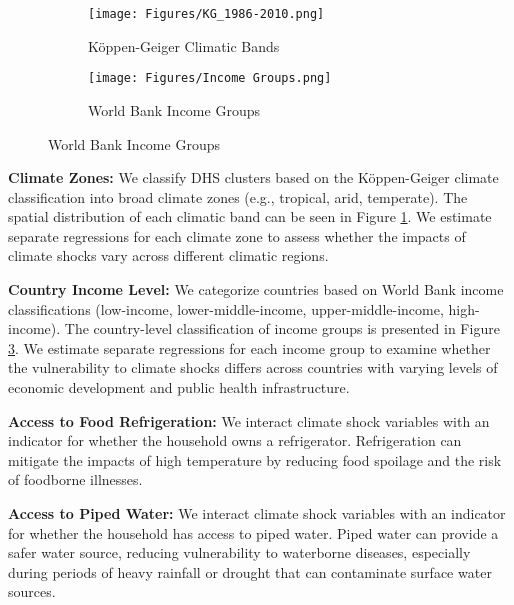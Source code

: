 \documentclass[a4paper]{article}
\begin{document}
\begin{figure}[t!]
    \caption{Geographic Distribution of Climate Zones and Income Groups}
    \begin{center}        
        \begin{subfigure}[b]{.8\linewidth}
            \texttt{[image: Figures/KG\_1986-2010.png]}
            \caption{Köppen-Geiger Climatic Bands}
            \label{fig:distr_KG} 
        \end{subfigure}
        \begin{subfigure}[b]{.8\linewidth}
            \texttt{[image: Figures/Income Groups.png]}
            \caption{World Bank Income Groups}
            \label{fig:distr_wbincomegroup} 
        \end{subfigure}
    \end{center}
\end{figure}


\noindent \textbf{Climate Zones:} We classify DHS clusters based on the Köppen-Geiger climate classification \cite{kottek2006,rubel2010} into broad climate zones (e.g., tropical, arid, temperate). The spatial distribution of each climatic band can be seen in Figure \ref{fig:distr_KG}. We estimate separate regressions for each climate zone to assess whether the impacts of climate shocks vary across different climatic regions.

\noindent \textbf{Country Income Level:} We categorize countries based on World Bank income classifications (low-income, lower-middle-income, upper-middle-income, high-income). The country-level classification of income groups is presented in Figure \ref{fig:distr_wbincomegroup}. We estimate separate regressions for each income group to examine whether the vulnerability to climate shocks differs across countries with varying levels of economic development and public health infrastructure.

\noindent \textbf{Access to Food Refrigeration:}  We interact climate shock variables with an indicator for whether the household owns a refrigerator.  Refrigeration can mitigate the impacts of high temperature by reducing food spoilage and the risk of foodborne illnesses.

\noindent \textbf{Access to Piped Water:}  We interact climate shock variables with an indicator for whether the household has access to piped water. Piped water can provide a safer water source, reducing vulnerability to waterborne diseases, especially during periods of heavy rainfall or drought that can contaminate surface water sources.
\end{document}

